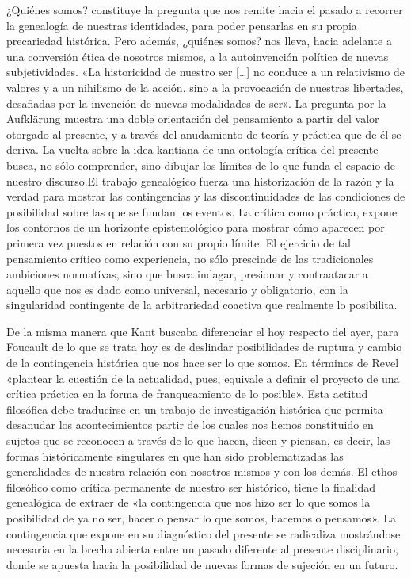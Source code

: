 ¿Quiénes somos? constituye la pregunta que nos remite hacia el pasado a recorrer la genealogía de nuestras identidades, para poder pensarlas en su propia precariedad histórica. Pero además, ¿quiénes somos? nos lleva, hacia adelante a una conversión ética de nosotros mismos, a la autoinvención política de nuevas subjetividades. «La historicidad de nuestro ser {[}\ldots{]} no conduce a un relativismo de valores y a un nihilismo de la acción, sino a la provocación de nuestras libertades, desafiadas por la invención de nuevas modalidades de ser». La pregunta por la Aufklärung muestra una doble orientación del pensamiento a partir del valor otorgado al presente, y a través del anudamiento de teoría y práctica que de él se deriva. La vuelta sobre la idea kantiana de una ontología crítica del presente busca, no sólo comprender, sino dibujar los límites de lo que funda el espacio de nuestro discurso.El trabajo genealógico fuerza una historización de la razón y la verdad para mostrar las contingencias y las discontinuidades de las condiciones de posibilidad sobre las que se fundan los eventos. La crítica como práctica, expone los contornos de un horizonte epistemológico para mostrar cómo aparecen por primera vez puestos en relación con su propio límite. El ejercicio de tal pensamiento crítico como experiencia, no sólo prescinde de las tradicionales ambiciones normativas, sino que busca indagar, presionar y contraatacar a aquello que nos es dado como universal, necesario y obligatorio, con la singularidad contingente de la arbitrariedad coactiva que realmente lo posibilita.

De la misma manera que Kant buscaba diferenciar el hoy respecto del ayer, para Foucault de lo que se trata hoy es de deslindar posibilidades de ruptura y cambio de la contingencia histórica que nos hace ser lo que somos. En términos de Revel «plantear la cuestión de la actualidad, pues, equivale a definir el proyecto de una crítica práctica en la forma de franqueamiento de lo posible». Esta actitud filosófica debe traducirse en un trabajo de investigación histórica que permita desanudar los acontecimientos partir de los cuales nos hemos constituido en sujetos que se reconocen a través de lo que hacen, dicen y piensan, es decir, las formas históricamente singulares en que han sido problematizadas las generalidades de nuestra relación con nosotros mismos y con los demás. El ethos filosófico como crítica permanente de nuestro ser histórico, tiene la finalidad genealógica de extraer de «la contingencia que nos hizo ser lo que somos la posibilidad de ya no ser, hacer o pensar lo que somos, hacemos o pensamos». La contingencia que expone en su diagnóstico del presente se radicaliza mostrándose necesaria en la brecha abierta entre un pasado diferente al presente disciplinario, donde se apuesta hacia la posibilidad de nuevas formas de sujeción en un futuro.

